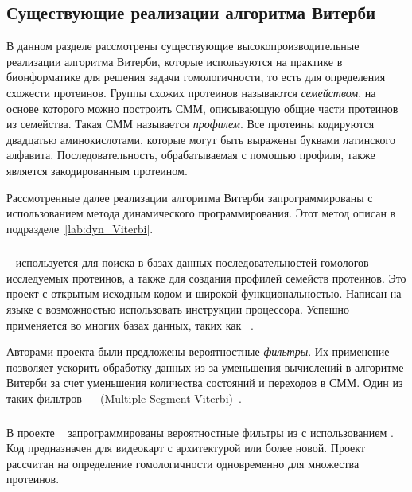 \subsection{Существующие реализации алгоритма Витерби}
В данном разделе рассмотрены существующие 
высокопроизводительные реализации алгоритма Витерби, которые 
используются на практике в бионформатике для решения задачи 
гомологичности, то есть для определения схожести протеинов.
Группы схожих протеинов называются \emph{семейством},
на основе которого можно построить СММ, описывающую общие 
части протеинов из семейства.
Такая СММ называется \emph{профилем}.
Все протеины кодируются двадцатью аминокислотами, 
которые могут быть выражены буквами латинского алфавита.
Последовательность, обрабатываемая с помощью профиля, также 
является закодированным протеином.

Рассмотренные далее реализации алгоритма Витерби 
запрограммированы с использованием метода динамического 
программирования.
Этот метод описан в подразделе~\ref{lab:dyn_Viterbi}.

\subsubsection{}
~\cite{HMMer} используется для поиска в базах 
данных последовательностей гомологов исследуемых протеинов, а 
также для создания профилей семейств протеинов.
Это проект с открытым исходным кодом и широкой 
функциональностью.
Написан на языке  с возможностью использовать 
 инструкции процессора.
Успешно применяется во многих базах данных, таких как ~\cite{Pfam}.

Авторами проекта были предложены вероятностные \emph{фильтры}.
Их применение позволяет ускорить обработку данных из-за 
уменьшения вычислений в алгоритме Витерби за счет уменьшения 
количества состояний и переходов в СММ.
Один из таких фильтров ---  (Multiple Segment 
Viterbi)~\cite{MSV_Eddy}.

\subsubsection{}
В проекте ~\cite{cudampf} запрограммированы 
вероятностные фильтры из  с использованием 
.
Код предназначен для видеокарт  с 
архитектурой  или более новой.
Проект рассчитан на определение гомологичности одновременно 
для множества протеинов.

